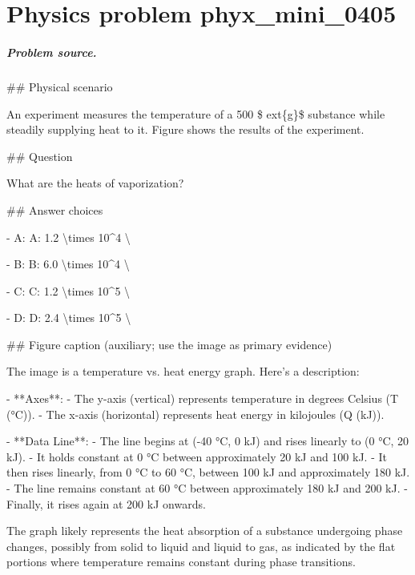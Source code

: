 
\chapter{Physics problem phyx\_mini\_0405}
\label{ch:PhyXMiniProblems_problem_phyx_mini_0405}

\paragraph{Problem source.}
\#\# Physical scenario

An experiment measures the temperature of a 500 \$	ext\{g\}\$ substance while steadily supplying heat to it. Figure shows the results of the experiment.

\#\# Question

What are the heats of vaporization?

\#\# Answer choices

- A: A: 1.2 \textbackslash{}times 10\textasciicircum{}4 \textbackslash{}

- B: B: 6.0 \textbackslash{}times 10\textasciicircum{}4 \textbackslash{}

- C: C: 1.2 \textbackslash{}times 10\textasciicircum{}5 \textbackslash{}

- D: D: 2.4 \textbackslash{}times 10\textasciicircum{}5 \textbackslash{}

\#\# Figure caption (auxiliary; use the image as primary evidence)

The image is a temperature vs. heat energy graph. Here’s a description:

- **Axes**: 
  - The y-axis (vertical) represents temperature in degrees Celsius (T (°C)).
  - The x-axis (horizontal) represents heat energy in kilojoules (Q (kJ)).

- **Data Line**:
  - The line begins at (-40 °C, 0 kJ) and rises linearly to (0 °C, 20 kJ).
  - It holds constant at 0 °C between approximately 20 kJ and 100 kJ.
  - It then rises linearly, from 0 °C to 60 °C, between 100 kJ and approximately 180 kJ.
  - The line remains constant at 60 °C between approximately 180 kJ and 200 kJ.
  - Finally, it rises again at 200 kJ onwards.

The graph likely represents the heat absorption of a substance undergoing phase changes, possibly from solid to liquid and liquid to gas, as indicated by the flat portions where temperature remains constant during phase transitions.

